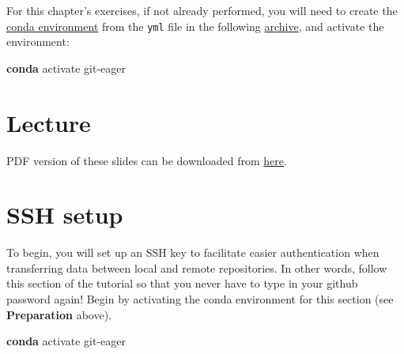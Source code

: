 \documentclass[
  letterpaper,
]{book}
\newenvironment{Shaded}{}{}
\newcommand{\ExtensionTok}[1]{\textcolor[rgb]{0.84,0.23,0.29}{\textbf{#1}}}
\newcommand{\NormalTok}[1]{\textcolor[rgb]{0.14,0.16,0.18}{#1}}
\begin{document}
\begin{tcolorbox}[enhanced jigsaw, opacitybacktitle=0.6, bottomtitle=1mm, opacityback=0, colback=white, coltitle=black, leftrule=.75mm, toprule=.15mm, title=\textcolor{quarto-callout-tip-color}{\faLightbulb}\hspace{0.5em}{Tip}, colframe=quarto-callout-tip-color-frame, toptitle=1mm, arc=.35mm, left=2mm, titlerule=0mm, breakable, rightrule=.15mm, bottomrule=.15mm, colbacktitle=quarto-callout-tip-color!10!white]

For this chapter's exercises, if not already performed, you will need to
create the \protect\hyperlink{creating-a-conda-environment}{conda
environment} from the \texttt{yml} file in the following
\href{https://doi.org/10.5281/zenodo.6983119}{archive}, and activate the
environment:

\begin{Shaded}
\begin{Highlighting}[]
\ExtensionTok{conda}\NormalTok{ activate git{-}eager}
\end{Highlighting}
\end{Shaded}

\end{tcolorbox}

\hypertarget{lecture-8}{%
\section{Lecture}\label{lecture-8}}

PDF version of these slides can be downloaded from
\href{https://github.com/SPAAM-community/https://github.com/SPAAM-community/wss-summer-school/raw/main/docs/raw/main/docs/assets/slides/2022/2b-intro-to-github/SPAAM\%20Summer\%20School\%202022\%20-\%202B\%20-\%20Introduction\%20to\%20Git(Hub).pdf}{here}.

\hypertarget{ssh-setup}{%
\section{SSH setup}\label{ssh-setup}}

To begin, you will set up an SSH key to facilitate easier authentication
when transferring data between local and remote repositories. In other
words, follow this section of the tutorial so that you never have to
type in your github password again! Begin by activating the conda
environment for this section (see \textbf{Preparation} above).

\begin{Shaded}
\begin{Highlighting}[]
\ExtensionTok{conda}\NormalTok{ activate git{-}eager}
\end{Highlighting}
\end{Shaded}
\end{document}
